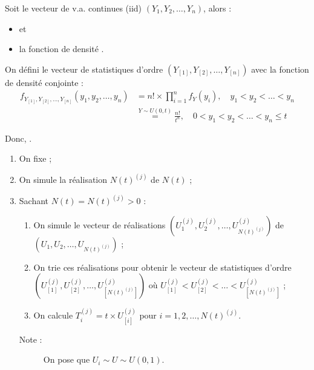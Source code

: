 \documentclass[10pt, french]{article}
\begin{document}
\begin{multicols*}{2}
\begin{definitionNOHFILLpropos}
Soit le vecteur de v.a. continues (iid) $(Y_{1}, Y_{2}, \dots, Y_{n})$, alors  :
\begin{itemize}
	\item	{} et 
	\item	la fonction de densité . 
\end{itemize}

On défini le vecteur de statistiques d'ordre $(Y_{[1]}, Y_{[2]}, \dots, Y_{[n]})$ avec la fonction de densité conjointe :
\begin{align*}
	f_{Y_{[1]}, Y_{[2]}, \dots, Y_{[n]}}(y_{1}, y_{2}, \dots, y_{n})	
	&=	n! \times \prod_{i = 1}^{n} f_{Y}(y_{i}), \quad	y_{1}	<	y_{2}	<	\dots	<	y_{n}	\\
	&\overset{Y \sim U(0, t)}{=}	\frac{n!}{t^{n}}, \quad 0	<	y_{1}	<	y_{2}	<	\dots	<	y_{n}	\leq		t
\end{align*}

Donc, .
\end{definitionNOHFILLpropos}

\begin{algo2}
\begin{enumerate}
	\item	On fixe  ;
	\item	On simule la réalisation $N(t)^{(j)}$ de $N(t)$ ;
	\item	Sachant $N(t)	=	N(t)^{(j)}	>	0$ :
		\begin{enumerate}[label = \alph*)]
		\item	On simule le vecteur de réalisations $\left( U_{1}^{(j)}, U_{2}^{(j)}, \dots, U_{N(t)^{(j)}}^{(j)}\right)$ de $\left( U_{1}, U_{2}, \dots, U_{N(t)^{(j)}}\right)$ ;
		\item	On trie ces réalisations pour obtenir le vecteur de statistiques d'ordre $\left( U_{[1]}^{(j)}, U_{[2]}^{(j)}, \dots, U_{[N(t)^{(j)}]}^{(j)}\right)$ où $ U_{[1]}^{(j)} < U_{[2]}^{(j)}< \dots < U_{[N(t)^{(j)}]}^{(j)}$ ;
		\item	On calcule $T_{i}^{(j)}	=	t \times U_{[i]}^{(j)}$ pour $i	=	1, 2, \dots, N(t)^{(j)}$.
		\end{enumerate}
		\begin{description}
		\item[Note :]	On pose que $U_{i} \sim U \sim U(0, 1)$.
		\end{description}
\end{enumerate}
\end{algo2}



\end{multicols*}
\end{document}
